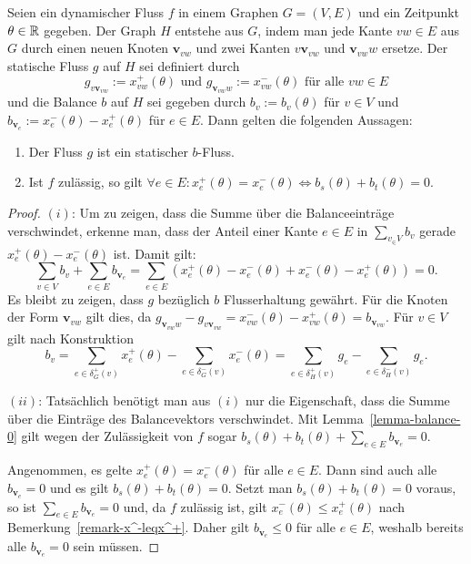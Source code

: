 \newcommand{\newv}{\mathbf{v}}
\begin{lemma}\label{lemma-b-graph}
	Seien ein dynamischer Fluss $f$ in einem Graphen $G=(V,E)$ und ein Zeitpunkt $\theta\in\mathbb{R}$ gegeben.
	Der Graph $H$ entstehe aus $G$, indem man jede Kante $vw\in E$ aus $G$ durch einen neuen Knoten $\newv_{vw}$ und zwei Kanten $v\newv_{vw}$ und $\newv_{vw}w$ ersetze.
	Der statische Fluss $g$ auf $H$ sei definiert durch
	$$g_{v\newv_{vw}} := x_{vw}^+(\theta) \text{ und } g_{\newv_{vw}w} := x_{vw}^-(\theta) \text{ für alle $vw\in E$}$$
	und die Balance $b$ auf $H$ sei gegeben durch $b_v:= b_v(\theta)$ für $v\in V$ und $b_{\newv_e}:= x_e^-(\theta) - x_e^+(\theta)$ für $e\in E$.
	Dann gelten die folgenden Aussagen:
	
	\begin{enumerate}[label=(\roman*)]
		\item Der Fluss $g$ ist ein statischer $b$-Fluss.
		\item\label{lemma-b-graph-imp} Ist $f$ zulässig, so gilt $\forall e\in E : x_e^+(\theta) = x_e^-(\theta)\iff b_s(\theta) + b_t(\theta) = 0$.
	\end{enumerate}
\end{lemma} 
\begin{proof}
	$(i)$: Um zu zeigen, dass die Summe über die Balanceeinträge verschwindet, erkenne man, dass der Anteil einer Kante $e\in E$ in $\sum_{v_\in V} b_v$ gerade $x_e^+(\theta) - x_e^-(\theta)$ ist.
	Damit gilt:
		$$\sum_{v\in V}b_v + \sum_{e\in E} b_{\newv_e} = \sum_{e\in E}  (x_e^+(\theta) - x_e^-(\theta) + x_e^-(\theta) - x_e^+(\theta)) = 0.$$
		Es bleibt zu zeigen, dass $g$ bezüglich $b$ Flusserhaltung gewährt.
		Für die Knoten der Form $\newv_{vw}$ gilt dies, da $g_{\newv_{vw}w} - g_{v\newv_{vw}} = x_{vw}^-(\theta) - x_{vw}^+(\theta) = b_{\newv_{vw}}$.
		Für $v\in V$ gilt nach Konstruktion $$b_v =
		\sum_{e\in\delta^+_G(v)} x_{e}^+(\theta) - \sum_{e\in\delta^-_G(v)} x_{e}^-(\theta) =
	\sum_{e\in\delta_H^+(v)} g_e - \sum_{e\in\delta^-_H(v)}g_e
		.$$
	
	$(ii)$: Tatsächlich benötigt man aus $(i)$ nur die Eigenschaft, dass die Summe über die Einträge des Balancevektors verschwindet.
	Mit Lemma~\ref{lemma-balance-0} gilt wegen der Zulässigkeit von $f$ sogar $b_s(\theta)+b_t(\theta) + \sum_{e\in E} b_{\newv_e} = 0$.
	
	Angenommen, es gelte $x_e^+(\theta) = x_e^-(\theta)$ für alle $e\in E$.
	Dann sind auch alle $b_{\newv_e} = 0$ und es gilt $b_s(\theta) + b_t(\theta) = 0$.
	Setzt man $b_s(\theta) + b_t(\theta) = 0$ voraus, so ist $\sum_{e\in E} b_{\newv_e} = 0$ und, da $f$ zulässig ist, gilt $x_e^-(\theta)\leq x_e^+(\theta)$ nach Bemerkung~\ref{remark-x^-leqx^+}.
	Daher gilt $b_{\newv_e}\leq 0$ für alle $e\in E$, weshalb bereits alle $b_{\newv_e} = 0$ sein müssen.
\end{proof}

